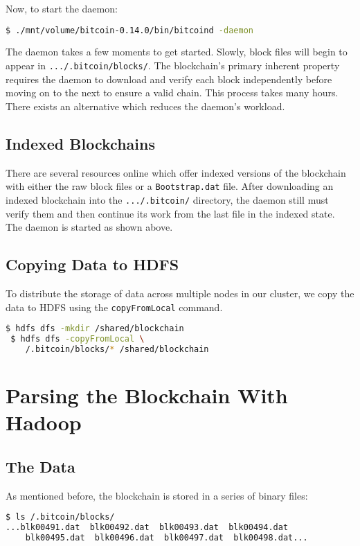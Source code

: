 \documentclass[9pt,twocolumn,twoside]{idsi}
\begin{document}
Now, to start the daemon:
\begin{lstlisting}[language=bash]
 $ ./mnt/volume/bitcoin-0.14.0/bin/bitcoind -daemon
\end{lstlisting}

The daemon takes a few moments to get started. Slowly, block files will begin to appear in \lstinline{.../.bitcoin/blocks/}.  The blockchain's primary inherent property requires the daemon to download and verify each block independently before moving on to the next to ensure a valid chain. This process takes many hours. There exists an alternative which reduces the daemon's workload.

\subsection{Indexed Blockchains}
There are several resources online which offer indexed versions of the blockchain with either the raw block files or a \lstinline{Bootstrap.dat} file. After downloading an indexed blockchain into the \lstinline{.../.bitcoin/} directory, the daemon still must verify them and then continue its work from the last file in the indexed state. The daemon is started as shown above.

\subsection{Copying Data to HDFS}

To distribute the storage of data across multiple nodes in our cluster, we copy the data to HDFS using the \lstinline{copyFromLocal} command.

\begin{lstlisting}[language=bash]
 $ hdfs dfs -mkdir /shared/blockchain
 $ hdfs dfs -copyFromLocal \
    /.bitcoin/blocks/* /shared/blockchain

\end{lstlisting}

\section{Parsing the Blockchain With Hadoop}
\subsection{The Data}
As mentioned before, the blockchain is stored in a series of binary files:
\begin{lstlisting}[language=bash]
 $ ls /.bitcoin/blocks/
...blk00491.dat  blk00492.dat  blk00493.dat  blk00494.dat
    blk00495.dat  blk00496.dat  blk00497.dat  blk00498.dat...
\end{lstlisting}
\end{document}
